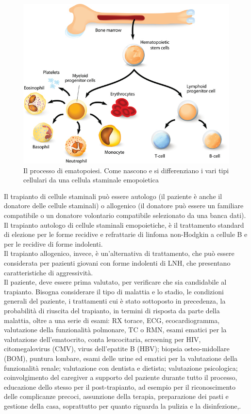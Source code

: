 \begin{figure}[H]
    \begin{center}
    \includegraphics[width=0.5\columnwidth]{img/transplant.jpeg}
    \vspace{-3mm}
    \end{center}
    \caption{Il processo di ematopoiesi. Come nascono e si differenziano i 
    vari tipi cellulari da una cellula staminale emopoietica
    \cite{img35}}
    \label{fig:FIGURE_3.14}
\end{figure}

Il trapianto di cellule staminali può essere autologo (il paziente è anche il donatore delle cellule staminali) 
o allogenico (il donatore può essere un familiare compatibile o un donatore volontario compatibile selezionato da una 
banca dati)\cite{LLS}.\\
Il trapianto autologo di cellule staminali emopoietiche, è il trattamento standard di elezione per le forme recidive e 
refrattarie di linfoma non-Hodgkin a cellule B\cite{TRANS} e per le recidive di forme indolenti.\\ 
Il trapianto allogenico, invece, è un’alternativa di trattamento, che può essere considerata per pazienti giovani con forme 
indolenti di LNH, che presentano caratteristiche di aggressività\cite{LLS}.\\
Il paziente, deve essere prima valutato, per verificare che sia candidabile al trapianto. 
Bisogna considerare il tipo di malattia e lo stadio, le condizioni generali del paziente, i trattamenti cui è stato 
sottoposto in precedenza, la probabilità di riuscita del trapianto, in termini di risposta da parte della malattia, 
oltre a una serie di esami: RX torace, ECG, ecocardiogramma, valutazione della funzionalità polmonare, TC o RMN, 
esami ematici per la valutazione dell’ematocrito, conta leucocitaria, screening per HIV, citomegalovirus (CMV), 
virus dell’epatite B (HBV); biopsia osteo-midollare (BOM), puntura lombare, esami delle urine ed ematici per la 
valutazione della funzionalità renale; valutazione con dentista e dietista; valutazione psicologica; 
coinvolgimento del caregiver a supporto del paziente durante tutto il processo, educazione dello stesso per il 
post-trapianto, ad esempio per il riconoscimento delle complicanze precoci, assunzione della terapia, preparazione 
dei pasti e gestione della casa, soprattutto per quanto riguarda la pulizia e la disinfezione\cite{LLS},\cite{STEMCELLS}.

